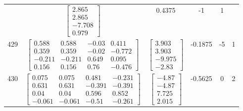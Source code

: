 \documentclass[a4paper,12pt]{article}
\begin{document}
\begin{tabular}{c c c c c c}
&
$\begin{bmatrix} 2.865 \\ 2.865 \\ -7.708 \\ 0.979 \end{bmatrix}$
&
0.4375
&
-1
&
1
\\
429
&
$\begin{bmatrix} 0.588 & 0.588 & -0.03 & 0.411 \\ 0.359 & 0.359 & -0.02 & -0.772 \\ -0.211 & -0.211 & 0.649 & 0.095 \\ 0.156 & 0.156 & 0.76 & -0.476 \end{bmatrix}$
&
$\begin{bmatrix} 3.903 \\ 3.903 \\ -9.975 \\ -2.83 \end{bmatrix}$
&
-0.1875
&
-5
&
1
\\
430
&
$\begin{bmatrix} 0.075 & 0.075 & 0.481 & -0.231 \\ 0.631 & 0.631 & -0.391 & -0.391 \\ 0.04 & 0.04 & 0.596 & 0.852 \\ -0.061 & -0.061 & -0.51 & -0.261 \end{bmatrix}$
&
$\begin{bmatrix} -4.87 \\ -4.87 \\ 7.725 \\ 2.015 \end{bmatrix}$
&
-0.5625
&
0
&
2
\\
\end{tabular} \egroup \newpage
\end{document}
